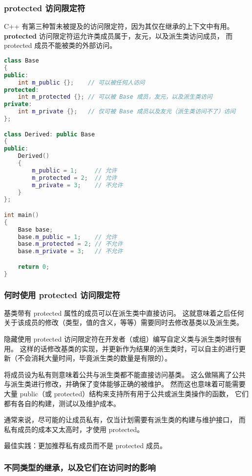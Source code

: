 \documentclass[../../LearnCpp.tex]{subfiles}
\begin{document}

\subsubsection*{protected 访问限定符}

C++ 有第三种暂未被提及的访问限定符，因为其仅在继承的上下文中有用。
\textbf{protected} 访问限定符运允许类成员属于，友元，以及派生类访问成员，
而 protected 成员不能被类的外部访问。

\begin{lstlisting}[language=C++]
class Base
{
public:
    int m_public {};    // 可以被任何人访问
protected:
    int m_protected {}; // 可以被 Base 成员，友元，以及派生类访问
private:
    int m_private {};   // 仅可被 Base 成员以及友元（派生类访问不了）访问
};

class Derived: public Base
{
public:
    Derived()
    {
        m_public = 1;     // 允许
        m_protected = 2;  // 允许
        m_private = 3;    // 不允许
    }
};

int main()
{
    Base base;
    base.m_public = 1;    // 允许
    base.m_protected = 2; // 不允许
    base.m_private = 3;   // 不允许

    return 0;
}
\end{lstlisting}

\subsubsection*{何时使用 protected 访问限定符}

基类带有 protected 属性的成员可以在派生类中直接访问。
这就意味着之后任何关于该成员的修改（类型，值的含义，等等）需要同时去修改基类以及派生类。

隐藏使用 protected 访问限定符在开发者（或组）编写自定义类与派生类时很有用。
这样的话修改基类的实现，并更新作为结果的派生类时，可以自主的进行更新（不会消耗大量时间，毕竟派生类的数量是有限的）。

将成员设为私有则意味着公共与派生类都不能直接访问基类。
这么做隔离了公共与派生类进行修改，并确保了变体能够正确的被维护。
然而这也意味着可能需要大量 public（或 protected）结构来支持所有用于公共或派生类操作的函数，
它们都有各自的构建，测试以及维护成本。

通常来说，尽可能的让成员私有，仅当计划需要有派生类的构建与维护接口，
而私有成员的成本又太高时，才使用 protected。

最佳实践：更加推荐私有成员而不是 protected 成员。

\subsubsection*{不同类型的继承，以及它们在访问时的影响}
\end{document}

